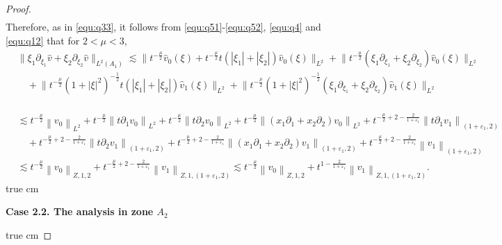 \documentclass[11pt,twoside]{article}
\newcommand{\p}{\partial}
\newcommand{\f}{\frac}
\theoremstyle{plain}
\theoremstyle{definition}
\theoremstyle{remark}
\numberwithin{equation}{section}
\begin{document}
\begin{proof}
\begin{equation}
\begin{aligned}
\end{aligned}
\end{equation}
Therefore, as in \eqref{equ:q33}, it follows from \eqref{equ:q51}-\eqref{equ:q52}, \eqref{equ:q4} and  \eqref{equ:q12} that for $2<\mu<3$,
\begin{equation*}\label{equ:q61}
\begin{aligned}
&\big\|\xi_1\p_{\xi_1}\hat{v}+\xi_2\p_{\xi_2}\hat{v}\big\|_{L^2(A_1)}
\lesssim \big\|t^{-\frac{\mu}{2}}\hat{v}_{0}(\xi)+t^{-\frac{\mu}{2}}t(|\xi_1|+|\xi_2|)\hat{v}_{0}(\xi)\big\|_{L^{2}}+ \big\|t^{-\f{\mu}{2}}(\xi_1\p_{\xi_1}+\xi_2\p_{\xi_2})\hat{v}_{0}(\xi)\big\|_{L^{2}}\\
&\quad +\big\|t^{-\frac{\mu}{2}}(1+|\xi|^2)^{-\f{1}{2}}t(|\xi_1|+|\xi_2|)\hat{v}_{1}(\xi)\big\|_{L^{2}}
+\big\|t^{-\f{\mu}{2}}(1+|\xi|^2)^{-\f{1}{2}}(\xi_1\p_{\xi_1}+\xi_2\p_{\xi_2})\hat{v}_{1}(\xi)\big\|_{L^{2}}\\
\end{aligned}
\end{equation*}

\begin{equation}\label{equ:q61}
\begin{aligned}
& \lesssim t^{-\frac{\mu}{2}}\left\|v_{0}\right\|_{L^{2}}+ t^{-\f{\mu}{2}} \left\|t\p_1v_0\right\|_{L^{2}}+t^{-\f{\mu}{2}} \left\|t\p_2v_0\right\|_{L^{2}}+ t^{-\f{\mu}{2}}\left\|(x_1\p_1+x_2\p_2)v_0\right\|_{L^{2}}+ t^{-\f{\mu}{2}+2-\f{2}{1+\varepsilon_1}}\left\|t\p_1v_1\right\|_{(1+\varepsilon_1, 2)}\\
&\quad +t^{-\f{\mu}{2}+2-\f{2}{1+\varepsilon_1}}\left\|t\p_2v_1\right\|_{(1+\varepsilon_1, 2)} + t^{-\f{\mu}{2}+2-\f{2}{1+\varepsilon_1}}\left\|(x_1\p_1+x_2\p_2)v_1\right\|_{(1+\varepsilon_1, 2)}+t^{-\f{\mu}{2}+2-\f{2}{1+\varepsilon_1}}\left\|v_1\right\|_{(1+\varepsilon_1, 2)}\\
&\lesssim  t^{-\frac{\mu}{2}}\left\|v_{0}\right\|_{Z, 1, 2}+ t^{-\f{\mu}{2}+2-\f{2}{1+\varepsilon_1}}\left\|v_1\right\|_{Z, 1,(1+\varepsilon_1, 2)}\lesssim t^{-\frac{\mu}{2}}\left\|v_{0}\right\|_{Z, 1, 2}+ t^{1-\f{2}{1+\varepsilon_1}}\left\|v_1\right\|_{Z, 1,(1+\varepsilon_1, 2)}.
\end{aligned}
\end{equation}
 true cm

{\bf Case 2.2.  The analysis  in zone $A_2$}

 true cm


\end{proof}
\end{document}
